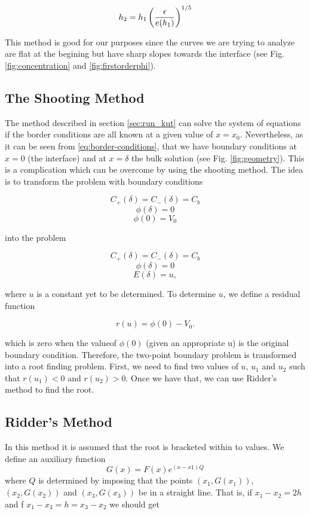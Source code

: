 \begin{equation}
h_2= h_1\left({\frac{\epsilon}{e(h_1)}}\right)^{1/5}
\label{eq:error}
\end{equation}

This method is good for our purposes since the curves we are trying to analyze are flat at the begining but have sharp slopes towards the interface (see Fig. \ref{fig:concentration} and \ref{fig:firstorderphi}).

\subsection{The Shooting Method}

The method described in section \ref{sec:run_kut} can solve the system of equations if the border conditions are all known at a given value of $x = x_0$. Nevertheless, as it can be seen from \ref{eq:border-conditions},
that we have boundary conditions at $x=0$ (the interface) and at $x=\delta$ the bulk solution (see Fig. \ref{fig:geometry}). This is a complication which can be overcome by using the shooting method. The idea is to transform the problem with boundary conditions 

$$C_+(\delta) = C_-(\delta) = C_b$$
$$\phi(\delta) = 0$$
$$\phi(0) = V_0$$

into the problem


$$C_+(\delta) = C_-(\delta) = C_b$$
$$\phi(\delta) = 0$$
$$E(\delta) = u,$$

where $u$ is a constant yet to be determined. To determine $u$, we define a residual function

$$r(u) = \phi(0)-V_0.$$

which is zero when the valueof $\phi(0)$ (given an appropriate u) is the original boundary condition. Therefore, the two-point boundary problem is transformed into a  root finding problem. First, we need to find two values of $u$, $u_1$ and $u_2$ such that $r(u_1) < 0$ and  $r(u_2) > 0$. Once we have that, we can use Ridder's method to find the root.

\subsection{Ridder's Method}

In this method it is assumed that the root is bracketed within to values.  We define an auxiliary function 
$$G(x) = F(x)e^{(x-x1)Q}$$
where $Q$ is determined by imposing that the points $(x_1, G(x_1))$, $(x_2, G(x_2))$ and $(x_3, G(x_3))$ be in a straight line. That is, if $x_1-x_2 = 2h$ and f $x_1-x_3 = h = x_3-x_2$ we should get

